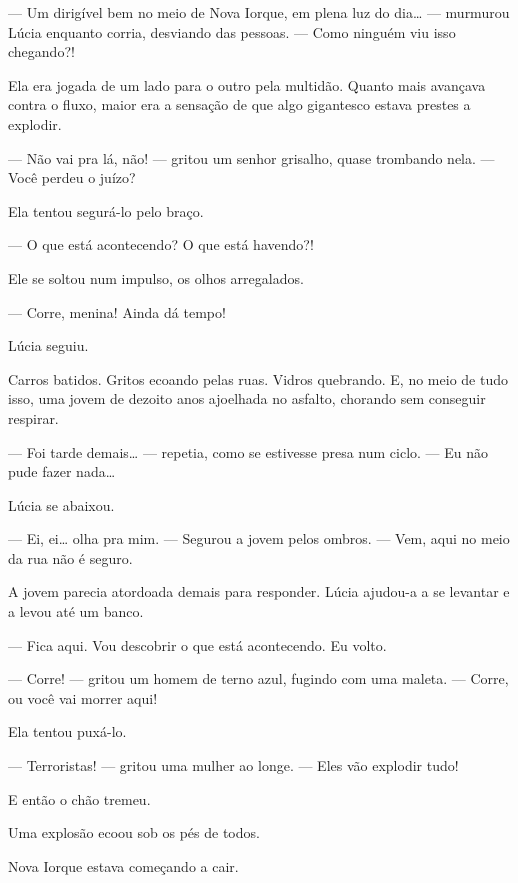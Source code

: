 — Um dirigível bem no meio de Nova Iorque, em plena luz do dia… — murmurou Lúcia enquanto corria, desviando das pessoas. — Como ninguém viu isso chegando?!

Ela era jogada de um lado para o outro pela multidão.  
Quanto mais avançava contra o fluxo, maior era a sensação de que algo gigantesco estava prestes a explodir.

— Não vai pra lá, não! — gritou um senhor grisalho, quase trombando nela. — Você perdeu o juízo?

Ela tentou segurá-lo pelo braço.

— O que está acontecendo? O que está havendo?!

Ele se soltou num impulso, os olhos arregalados.

— Corre, menina! Ainda dá tempo!

Lúcia seguiu.

Carros batidos.  
Gritos ecoando pelas ruas.  
Vidros quebrando.  
E, no meio de tudo isso, uma jovem de dezoito anos ajoelhada no asfalto, chorando sem conseguir respirar.

— Foi tarde demais… — repetia, como se estivesse presa num ciclo. — Eu não pude fazer nada…

Lúcia se abaixou.

— Ei, ei… olha pra mim. — Segurou a jovem pelos ombros. — Vem, aqui no meio da rua não é seguro.

A jovem parecia atordoada demais para responder.
Lúcia ajudou-a a se levantar e a levou até um banco.

— Fica aqui. Vou descobrir o que está acontecendo. Eu volto.

— Corre! — gritou um homem de terno azul, fugindo com uma maleta. — Corre, ou você vai morrer aqui!

Ela tentou puxá-lo.

— Terroristas! — gritou uma mulher ao longe. — Eles vão explodir tudo!

E então o chão tremeu.

Uma explosão ecoou sob os pés de todos.

Nova Iorque estava começando a cair.
